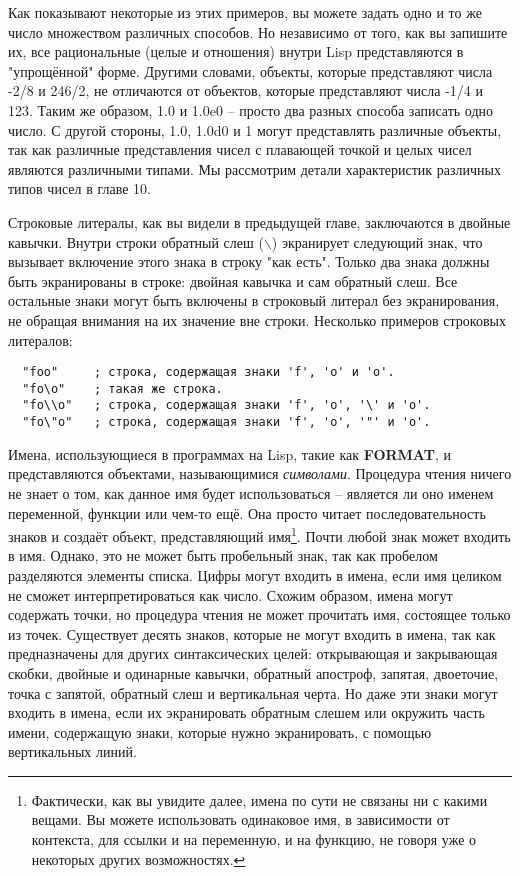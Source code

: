 Как показывают некоторые из этих примеров, вы можете задать одно и то же число множеством
различных способов. Но независимо от того, как вы запишите их, все рациональные (целые и
отношения) внутри Lisp представляются в "упрощённой" форме. Другими словами, объекты,
которые представляют числа -2/8 и 246/2, не отличаются от объектов, которые представляют
числа -1/4 и 123. Таким же образом, 1.0 и 1.0e0 -- просто два разных способа записать одно
число. С другой стороны, 1.0, 1.0d0 и 1 могут представлять различные объекты, так как
различные представления чисел с плавающей точкой и целых чисел являются различными
типами. Мы рассмотрим детали характеристик различных типов чисел в главе 10.

Строковые литералы, как вы видели в предыдущей главе, заключаются в двойные
кавычки. Внутри строки обратный слеш ($\backslash$) экранирует следующий знак, что
вызывает включение этого знака в строку "как есть". Только два знака должны быть
экранированы в строке: двойная кавычка и сам обратный слеш. Все остальные знаки могут быть
включены в строковый литерал без экранирования, не обращая внимания на их значение вне
строки. Несколько примеров строковых литералов:

\begin{verbatim}
  "foo"     ; строка, содержащая знаки 'f', 'o' и 'o'.
  "fo\o"    ; такая же строка.
  "fo\\o"   ; строка, содержащая знаки 'f', 'o', '\' и 'o'.
  "fo\"o"   ; строка, содержащая знаки 'f', 'o', '"' и 'o'.
\end{verbatim}

Имена, использующиеся в программах на Lisp, такие как \textbf{FORMAT}, 
и  представляются объектами, называющимися \textit{символами}. Процедура чтения
ничего не знает о том, как данное имя будет использоваться -- является ли оно именем
переменной, функции или чем-то ещё. Она просто читает последовательность знаков и создаёт
объект, представляющий имя\footnote{Фактически, как вы увидите далее, имена по сути не
  связаны ни с какими вещами. Вы можете использовать одинаковое имя, в зависимости от
  контекста, для ссылки и на переменную, и на функцию, не говоря уже о некоторых других
  возможностях.}. Почти любой знак может входить в имя. Однако, это не может быть
пробельный знак, так как пробелом разделяются элементы списка. Цифры могут входить в
имена, если имя целиком не сможет интерпретироваться как число. Схожим образом, имена
могут содержать точки, но процедура чтения не может прочитать имя, состоящее только из
точек. Существует десять знаков, которые не могут входить в имена, так как предназначены
для других синтаксических целей: открывающая и закрывающая скобки, двойные и одинарные
кавычки, обратный апостроф, запятая, двоеточие, точка с запятой, обратный слеш и
вертикальная черта. Но даже эти знаки могут входить в имена, если их экранировать обратным
слешем или окружить часть имени, содержащую знаки, которые нужно экранировать, с помощью
вертикальных линий.

